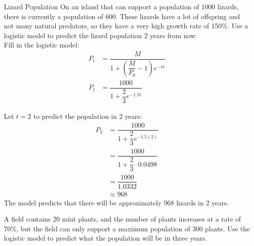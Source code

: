 \begin{example}[https://www.youtube.com/watch?v=cd5xQCfLUZM]{Lizard Population}
On an island that can support a population of 1000 lizards, there is currently a population of 600.  These lizards have a lot of offspring and not many natural predators, so they have a very high growth rate of 150\%.  Use a logistic model to predict the lizard population 2 years from now.\\

Fill in the logistic model:
\begin{align*}
P_t &= \dfrac{M}{1+\left(\dfrac{M}{P_0}-1\right)e^{-rt}}\\
P_t &= \dfrac{1000}{1+\dfrac{2}{3}e^{-1.5t}}
\end{align*}

\begin{center}
\end{center}

Let $t=2$ to predict the population in 2 years:
\begin{align*}
P_2 &= \dfrac{1000}{1+\dfrac{2}{3}e^{-1.5(2)}}\\
 &= \dfrac{1000}{1+\dfrac{2}{3}\cdot 0.0498}\\
 &= \dfrac{1000}{1.0332}\\
 &\approx 968
\end{align*}
The model predicts that there will be approximately 968 lizards in 2 years.
\end{example}

\begin{try}
A field contains 20 mint plants, and the number of plants increases at a rate of 70\%, but the field can only support a maximum population of 300 plants.  Use the logistic model to predict what the population will be in three years.
\end{try}

